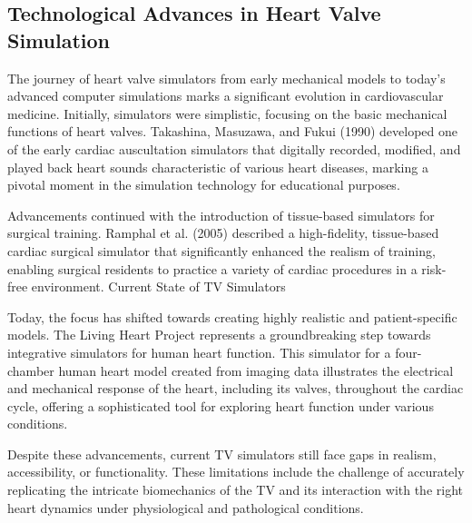 \subsection{Technological Advances in Heart Valve Simulation}


The journey of heart valve simulators from early mechanical models to today's advanced computer simulations marks a significant evolution in cardiovascular medicine. Initially, simulators were simplistic, focusing on the basic mechanical functions of heart valves. Takashina, Masuzawa, and Fukui (1990) developed one of the early cardiac auscultation simulators that digitally recorded, modified, and played back heart sounds characteristic of various heart diseases, marking a pivotal moment in the simulation technology for educational purposes. \cite{takashinaNewCardiacAuscultation1990}

Advancements continued with the introduction of tissue-based simulators for surgical training. Ramphal et al. (2005) described a high-fidelity, tissue-based cardiac surgical simulator that significantly enhanced the realism of training, enabling surgical residents to practice a variety of cardiac procedures in a risk-free environment. \cite{ramphalHighFidelityTissuebased2005}
Current State of \gls{TV} Simulators

Today, the focus has shifted towards creating highly realistic and patient-specific models. The Living Heart Project represents a groundbreaking step towards integrative simulators for human heart function. This simulator for a four-chamber human heart model created from imaging data illustrates the electrical and mechanical response of the heart, including its valves, throughout the cardiac cycle, offering a sophisticated tool for exploring heart function under various conditions. \cite{baillargeonLivingHeartProject2014}

Despite these advancements, current \gls{TV} simulators still face gaps in realism, accessibility, or functionality. These limitations include the challenge of accurately replicating the intricate biomechanics of the \gls{TV} and its interaction with the right heart dynamics under physiological and pathological conditions.


